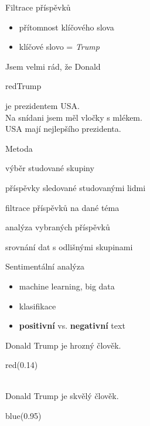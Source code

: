 \documentclass[notheorems,12pt]{beamer}
\newcommand{\cmark}{\ding{51}} %
\newcommand{\xmark}{\ding{55}} %
\begin{document}
\begin{frame}{Filtrace příspěvků}
\begin{itemize}
    \item přítomnost klíčového slova
    \item klíčové slovo = \textit{Trump}
\end{itemize}
\center
Jsem velmi rád, že Donald \begin{color}{red}Trump\end{color} je prezidentem USA. \cmark\\
\vspace{0.2cm}
Na snídani jsem měl vločky s mlékem. \xmark\\
\vspace{0.2cm}
USA mají nejlepšího prezidenta. \xmark\\
\end{frame}
\begin{frame}{Metoda}
    \begin{enumerate}
        \begin{large}
        \item výběr studované skupiny
        \vspace{0.25cm}
        \item příspěvky sledované studovanými lidmi
        \vspace{0.25cm}
        \item filtrace příspěvků na dané téma
        \vspace{0.25cm}
        \item analýza vybraných příspěvků
        \vspace{0.25cm}
        \item srovnání dat s odlišnými skupinami
        \end{large}
    \end{enumerate}
\end{frame}
\begin{frame}{Sentimentální analýza}
\begin{itemize}
    \item machine learning, big data
    \item klasifikace
    \item \textbf{positivní} vs. \textbf{negativní} text
\end{itemize}
\center
Donald Trump je hrozný člověk.\\
\begin{color}{red}(0.14)\end{color}\\
\vspace{0.5cm}
Donald Trump je skvělý člověk.\\
\begin{color}{blue}(0.95)\end{color}
\end{frame}
\end{document}
